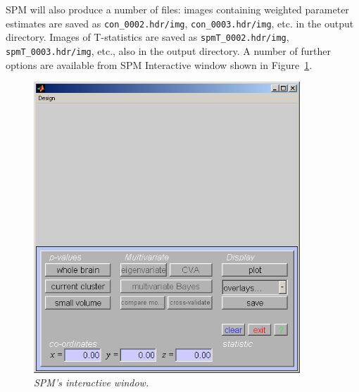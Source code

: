 SPM will also produce a number of files: images containing weighted parameter estimates are saved as \verb!con_0002.hdr/img!, \verb!con_0003.hdr/img!, etc. in the output directory. Images of T-statistics are saved as \verb!spmT_0002.hdr/img!, \verb!spmT_0003.hdr/img!, etc., also in the output directory. A number of
further options are available from SPM Interactive window shown in Figure~\ref{interactive}.
\begin{figure}
\begin{center}
\includegraphics[width=100mm]{pet/interactive}
\caption{\em SPM's interactive window.  \label{interactive}}
\end{center}
\end{figure}

